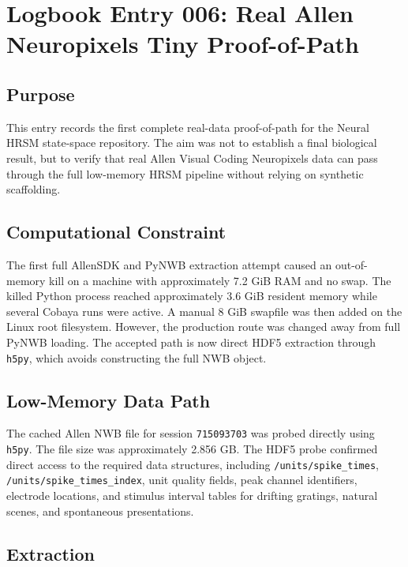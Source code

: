 \section{Logbook Entry 006: Real Allen Neuropixels Tiny Proof-of-Path}
\label{sec:logbook-entry-006-real-allen-tiny-proof}

\subsection{Purpose}

This entry records the first complete real-data proof-of-path for the Neural HRSM state-space repository. The aim was not to establish a final biological result, but to verify that real Allen Visual Coding Neuropixels data can pass through the full low-memory HRSM pipeline without relying on synthetic scaffolding.

\subsection{Computational Constraint}

The first full AllenSDK and PyNWB extraction attempt caused an out-of-memory kill on a machine with approximately 7.2 GiB RAM and no swap. The killed Python process reached approximately 3.6 GiB resident memory while several Cobaya runs were active. A manual 8 GiB swapfile was then added on the Linux root filesystem. However, the production route was changed away from full PyNWB loading. The accepted path is now direct HDF5 extraction through \texttt{h5py}, which avoids constructing the full NWB object.

\subsection{Low-Memory Data Path}

The cached Allen NWB file for session \texttt{715093703} was probed directly using \texttt{h5py}. The file size was approximately 2.856 GB. The HDF5 probe confirmed direct access to the required data structures, including \texttt{/units/spike\_times}, \texttt{/units/spike\_times\_index}, unit quality fields, peak channel identifiers, electrode locations, and stimulus interval tables for drifting gratings, natural scenes, and spontaneous presentations.

\subsection{Extraction}

